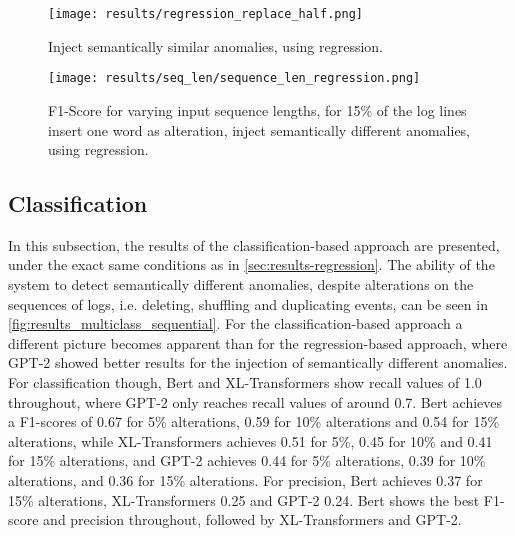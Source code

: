 
\begin{figure}[H]
  \centering
  \captionsetup{justification=centering}
  \texttt{[image: results/regression\_replace\_half.png]}\\
  \caption{Inject semantically similar anomalies, using regression.}
  \label{fig:replace_words_regression}
\end{figure}

\begin{figure}[H]
  \centering
  \captionsetup{justification=centering}
  \texttt{[image: results/seq\_len/sequence\_len\_regression.png]}\\
  \caption{F1-Score for varying input sequence lengths, for 15\% of the log lines insert one word as alteration, inject semantically different anomalies, using regression.}
  \label{fig:seq_len_regression}
\end{figure}




\newpage
\subsection{Classification\label{sec:results-classification}}
In this subsection, the results of the classification-based approach are presented, under the exact same conditions as in \ref{sec:results-regression}. 
The ability of the system to detect semantically different anomalies, despite alterations on the sequences of logs, i.e. deleting, shuffling and duplicating events, can be seen in \ref{fig:results_multiclass_sequential}. For the classification-based approach a different picture becomes apparent than for the regression-based approach, where GPT-2 showed better results for the injection of semantically different anomalies. For classification though, Bert and XL-Transformers show recall values of 1.0 throughout, where GPT-2 only reaches recall values of around 0.7. Bert achieves a F1-scores of 0.67 for 5\% alterations, 0.59 for 10\% alterations and 0.54 for 15\% alterations, while XL-Transformers achieves 0.51 for 5\%, 0.45 for 10\% and 0.41 for 15\% alterations, and GPT-2 achieves 0.44 for 5\% alterations, 0.39 for 10\% alterations, and 0.36 for 15\% alterations. For precision, Bert achieves 0.37 for 15\% alterations, XL-Transformers 0.25 and GPT-2 0.24.
Bert shows the best F1-score and precision throughout, followed by XL-Transformers and GPT-2.

